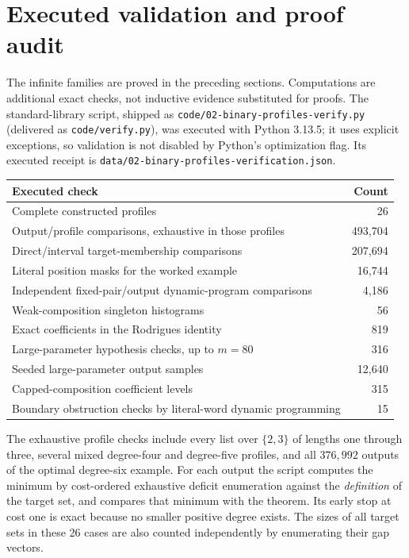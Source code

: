 \documentclass[11pt,letterpaper]{article}
\theoremstyle{definition}\newtheorem{definition}[theorem]{Definition}
\theoremstyle{remark}\newtheorem{remark}[theorem]{Remark}
\theoremstyle{definition}\newtheorem{question}[theorem]{Question}
\begin{document}
\section{Executed validation and proof audit}
\label{ids:bp:sec:validation}

The infinite families are proved in the preceding sections. Computations are
additional exact checks, not inductive evidence substituted for proofs. The
standard-library script, shipped as
\nolinkurl{code/02-binary-profiles-verify.py} (delivered as
\texttt{code/verify.py}), was executed with Python 3.13.5; it uses explicit
exceptions, so validation is not disabled by Python's optimization flag. Its
executed receipt is \nolinkurl{data/02-binary-profiles-verification.json}.

\begin{center}
\begin{tabular}{@{}p{}r@{}}
\toprule
\textbf{Executed check} & \textbf{Count}\\
\midrule
Complete constructed profiles & 26\\
Output/profile comparisons, exhaustive in those profiles & 493,704\\
Direct/interval target-membership comparisons & 207,694\\
Literal position masks for the worked example & 16,744\\
Independent fixed-pair/output dynamic-program comparisons & 4,186\\
Weak-composition singleton histograms & 56\\
Exact coefficients in the Rodrigues identity & 819\\
Large-parameter hypothesis checks, up to $m=80$ & 316\\
Seeded large-parameter output samples & 12,640\\
Capped-composition coefficient levels & 315\\
Boundary obstruction checks by literal-word dynamic programming & 15\\
\bottomrule
\end{tabular}
\end{center}

The exhaustive profile checks include every list over $\{2,3\}$ of lengths
one through three, several mixed degree-four and degree-five profiles, and
all $376{,}992$ outputs of the optimal degree-six example. For each output the
script computes the minimum by cost-ordered exhaustive deficit enumeration
against the \emph{definition} of the target set, and compares that minimum
with the theorem. Its early stop at cost one is exact because no smaller
positive degree exists. The sizes of all target sets in these 26 cases are
also counted independently by enumerating their gap vectors.
\end{document}
